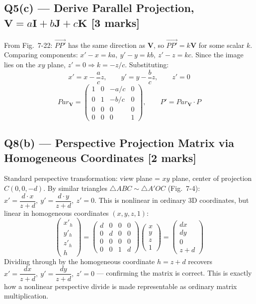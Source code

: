 \documentclass[12pt, a4paper]{article}
\newenvironment{solutionbox}{\begin{mdframed}[style=solutionframe]}{\end{mdframed}}
\begin{document}
\subsection*{Q5(c) --- Derive Parallel Projection, $\mathbf V=a\mathbf I+b\mathbf J+c\mathbf K$ [3 marks]}
\begin{solutionbox}
From Fig.\ 7-22: $\overrightarrow{PP'}$ has the same direction as $\mathbf V$, so $\overrightarrow{PP'}=k\mathbf V$ for some scalar $k$. Comparing components: $x'-x=ka,\ y'-y=kb,\ z'-z=kc$. Since the image lies on the $xy$ plane, $z'=0 \Rightarrow k=-z/c$. Substituting:
$$x' = x - \frac{a}{c}z, \qquad y' = y - \frac{b}{c}z, \qquad z'=0$$
$$Par_{\mathbf V} = \begin{pmatrix}1&0&-a/c&0\\0&1&-b/c&0\\0&0&0&0\\0&0&0&1\end{pmatrix}, \qquad P' = Par_{\mathbf V}\cdot P$$
\end{solutionbox}

\subsection*{Q8(b) --- Perspective Projection Matrix via Homogeneous Coordinates [2 marks]}
\begin{solutionbox}
Standard perspective transformation: view plane = $xy$ plane, center of projection $C(0,0,-d)$. By similar triangles $\triangle ABC \sim \triangle A'OC$ (Fig.\ 7-4): $x'=\dfrac{d\cdot x}{z+d},\ y'=\dfrac{d\cdot y}{z+d},\ z'=0$. This is nonlinear in ordinary 3D coordinates, but linear in homogeneous coordinates $(x,y,z,1)$:
$$\begin{pmatrix}x'_h\\y'_h\\z'_h\\h\end{pmatrix} = \begin{pmatrix}d&0&0&0\\0&d&0&0\\0&0&0&0\\0&0&1&d\end{pmatrix}\begin{pmatrix}x\\y\\z\\1\end{pmatrix} = \begin{pmatrix}dx\\dy\\0\\z+d\end{pmatrix}$$
Dividing through by the homogeneous coordinate $h=z+d$ recovers $x'=\dfrac{dx}{z+d},\ y'=\dfrac{dy}{z+d},\ z'=0$ --- confirming the matrix is correct. This is exactly how a nonlinear perspective divide is made representable as ordinary matrix multiplication.
\end{solutionbox}
\end{document}
